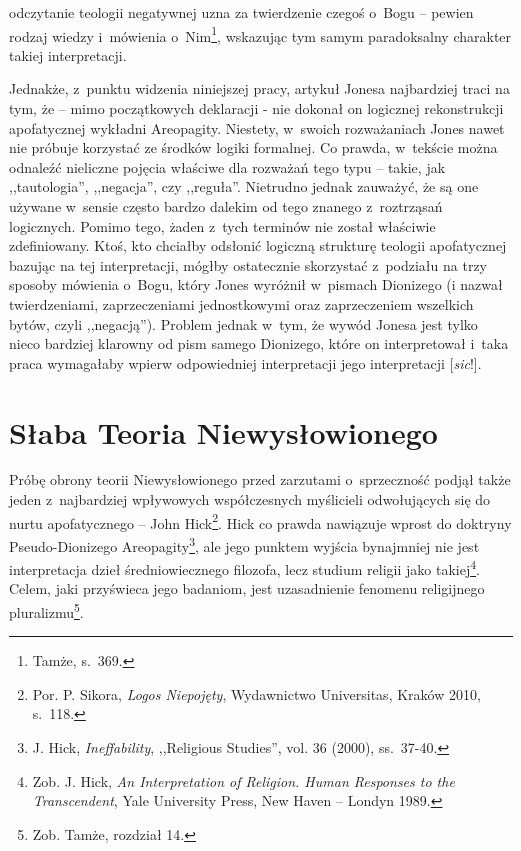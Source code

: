 odczytanie teologii negatywnej uzna za twierdzenie czegoś o~Bogu -- pewien rodzaj wiedzy i~mówienia o~Nim\footnote{Tamże, s.~369.}, wskazując tym samym paradoksalny charakter takiej interpretacji.

Jednakże, z~punktu widzenia niniejszej pracy, artykuł Jonesa najbardziej traci na tym, że -- mimo początkowych deklaracji - nie dokonał on logicznej rekonstrukcji apofatycznej wykładni Areopagity. Niestety, w~swoich rozważaniach Jones nawet nie próbuje korzystać ze środków logiki formalnej. Co prawda, w~tekście można odnaleźć nieliczne pojęcia właściwe dla rozważań tego typu -- takie, jak ,,tautologia'', ,,negacja'', czy ,,reguła''. Nietrudno jednak zauważyć, że są one używane w~sensie często bardzo dalekim od tego znanego z~roztrząsań logicznych. Pomimo tego, żaden z~tych terminów nie został właściwie zdefiniowany. Ktoś, kto chciałby odsłonić logiczną strukturę teologii apofatycznej bazując na tej interpretacji, mógłby ostatecznie skorzystać z~podziału na trzy sposoby mówienia o~Bogu, który Jones wyróżnił w~pismach Dionizego (i nazwał twierdzeniami, zaprzeczeniami jednostkowymi oraz zaprzeczeniem wszelkich bytów, czyli ,,negacją''). Problem jednak w~tym, że wywód Jonesa jest tylko nieco bardziej klarowny od pism samego Dionizego, które on interpretował i~taka praca wymagałaby wpierw odpowiedniej interpretacji jego interpretacji [\textit{sic}!].


\chapter{Słaba Teoria Niewysłowionego}\label{sil-slabatn}

Próbę obrony teorii Niewysłowionego przed zarzutami o~sprzeczność podjął także jeden z~najbardziej wpływowych współczesnych myślicieli odwołujących się do nurtu apofatycznego -- John Hick\footnote{Por. P. Sikora, \textit{Logos Niepojęty}, Wydawnictwo Universitas, Kraków 2010, s.~118.}. Hick co prawda nawiązuje wprost do doktryny Pseudo-Dionizego Areopagity\footnote{J. Hick, \textit{Ineffability}, ,,Religious Studies'', vol. 36 (2000), ss.~37-40.}, ale jego punktem wyjścia bynajmniej nie jest interpretacja dzieł średniowiecznego filozofa, lecz studium religii jako takiej\footnote{Zob. J. Hick, \textit{An Interpretation of Religion. Human Responses to the Transcendent}, Yale University Press, New Haven -- Londyn 1989.}. Celem, jaki przyświeca jego badaniom, jest uzasadnienie fenomenu religijnego pluralizmu\footnote{Zob. Tamże, rozdział 14.}.

